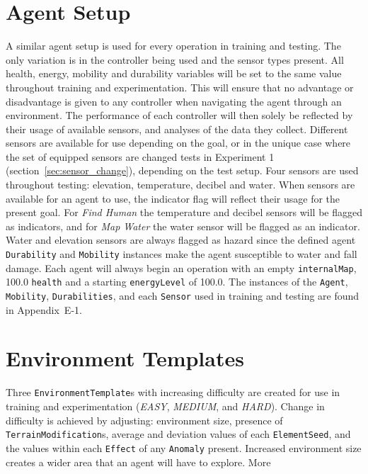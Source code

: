 \section{Agent Setup} \label{sec:agent_setups}
A similar agent setup is used for every operation in training and testing.
The only variation is in the controller being used and the sensor types present.
All health, energy, mobility and durability variables will be set to the same value throughout training and experimentation.
This will ensure that no advantage or disadvantage is given to any controller when navigating the agent through an environment.
The performance of each controller will then solely be reflected by their usage of available sensors, and analyses of the data they collect.
Different sensors are available for use depending on the goal, or in the unique case where the set of equipped sensors are changed tests in Experiment 1 (section~\ref{sec:sensor_change}), depending on the test setup.
Four sensors are used throughout testing: elevation, temperature, decibel and water.
When sensors are available for an agent to use, the indicator flag will reflect their usage for the present goal.
For \textit{Find Human} the temperature and decibel sensors will be flagged as indicators, and for \textit{Map Water} the water sensor will be flagged as an indicator.
Water and elevation sensors are always flagged as hazard since the defined agent \texttt{Durability} and \texttt{Mobility} instances make the agent susceptible to water and fall damage.
Each agent will always begin an operation with an empty \texttt{internalMap}, 100.0 \texttt{health} and a starting \texttt{energyLevel} of 100.0.
The instances of the \texttt{Agent}, \texttt{Mobility}, \texttt{Durabilities}, and each \texttt{Sensor} used in training and testing are found in Appendix~E-1.


\section{Environment Templates} \label{sec:test_environment_templates}
Three \texttt{EnvironmentTemplate}s with increasing difficulty are created for use in training and experimentation (\textit{EASY}, \textit{MEDIUM}, and \textit{HARD}).
Change in difficulty is achieved by adjusting: environment size, presence of \texttt{TerrainModification}s, average and deviation values of each \texttt{ElementSeed}, and the values within each \texttt{Effect} of any \texttt{Anomaly} present.
Increased environment size creates a wider area that an agent will have to explore.
More

